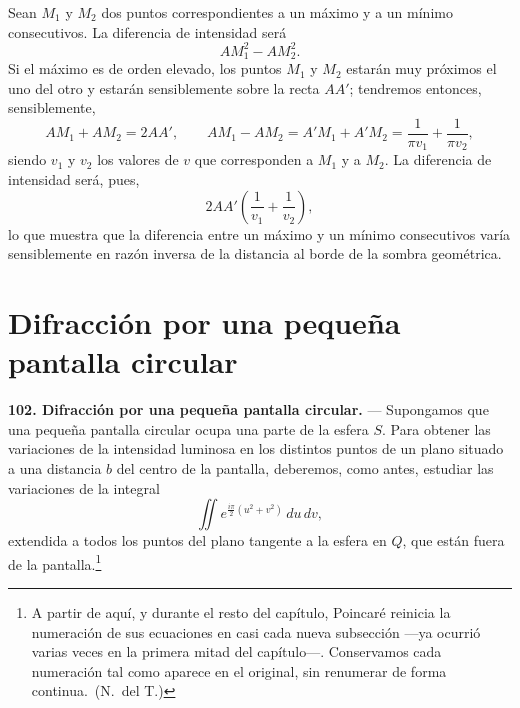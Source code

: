 Sean $M_1$ y $M_2$ dos puntos correspondientes a un máximo y a un mínimo
consecutivos. La diferencia de intensidad será
\[
AM_1^2 - AM_2^2.
\]
Si el máximo es de orden elevado, los puntos $M_1$ y $M_2$ estarán muy
próximos el uno del otro y estarán sensiblemente sobre la recta $AA'$;
tendremos entonces, sensiblemente,
\[
AM_1+AM_2 = 2AA',\qquad
AM_1-AM_2 = A'M_1+A'M_2 = \frac1{\pi v_1}+\frac1{\pi v_2},
\]
siendo $v_1$ y $v_2$ los valores de $v$ que corresponden a $M_1$ y a
$M_2$. La diferencia de intensidad será, pues,
\[
2AA'\left(\frac1{v_1}+\frac1{v_2}\right),
\]
lo que muestra que la diferencia entre un máximo y un mínimo consecutivos
varía sensiblemente en razón inversa de la distancia al borde de la
sombra geométrica.

\section{Difracción por una pequeña pantalla circular}

\noindent\textbf{102. Difracción por una pequeña pantalla circular.} —
Supongamos que una pequeña pantalla circular ocupa una parte de la esfera
$S$. Para obtener las variaciones de la intensidad luminosa en los
distintos puntos de un plano situado a una distancia $b$ del centro de la
pantalla, deberemos, como antes, estudiar las variaciones de la integral
\begin{equation}
\iint e^{\frac{i\pi}{2}(u^2+v^2)}\,du\,dv,
\tag{1}
\end{equation}
extendida a todos los puntos del plano tangente a la esfera en $Q$, que
están fuera de la pantalla.\footnote{A partir de aquí, y durante el resto
del capítulo, Poincaré reinicia la numeración de sus ecuaciones en casi
cada nueva subsección —ya ocurrió varias veces en la primera mitad del
capítulo—. Conservamos cada numeración tal como aparece en el original,
sin renumerar de forma continua.~(N.~del T.)}

